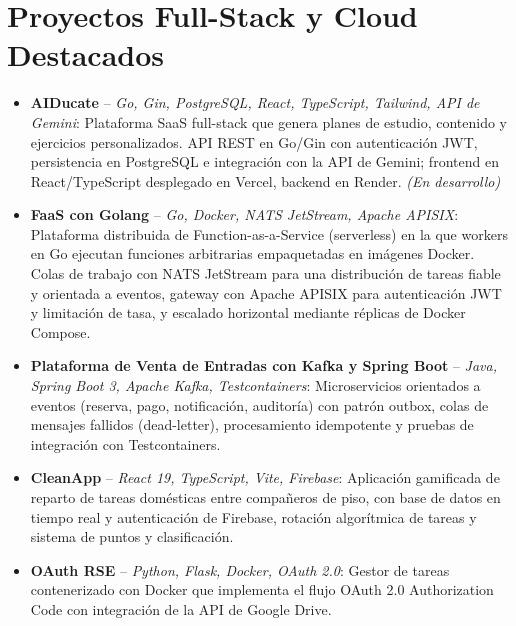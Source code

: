 \documentclass[11pt,a4paper,sans]{moderncv}
\begin{document}

\section{Proyectos Full-Stack y Cloud Destacados}
\vspace{1pt}
\begin{itemize}

\item \textbf{AIDucate} -- \textit{Go, Gin, PostgreSQL, React, TypeScript, Tailwind, API de Gemini}: Plataforma SaaS full-stack que genera planes de estudio, contenido y ejercicios personalizados. API REST en Go/Gin con autenticación JWT, persistencia en PostgreSQL e integración con la API de Gemini; frontend en React/TypeScript desplegado en Vercel, backend en Render. \textit{(En desarrollo)}

\item \textbf{FaaS con Golang} -- \textit{Go, Docker, NATS JetStream, Apache APISIX}: Plataforma distribuida de Function-as-a-Service (serverless) en la que workers en Go ejecutan funciones arbitrarias empaquetadas en imágenes Docker. Colas de trabajo con NATS JetStream para una distribución de tareas fiable y orientada a eventos, gateway con Apache APISIX para autenticación JWT y limitación de tasa, y escalado horizontal mediante réplicas de Docker Compose.

\item \textbf{Plataforma de Venta de Entradas con Kafka y Spring Boot} -- \textit{Java, Spring Boot 3, Apache Kafka, Testcontainers}: Microservicios orientados a eventos (reserva, pago, notificación, auditoría) con patrón outbox, colas de mensajes fallidos (dead-letter), procesamiento idempotente y pruebas de integración con Testcontainers.

\item \textbf{CleanApp} -- \textit{React 19, TypeScript, Vite, Firebase}: Aplicación gamificada de reparto de tareas domésticas entre compañeros de piso, con base de datos en tiempo real y autenticación de Firebase, rotación algorítmica de tareas y sistema de puntos y clasificación.

\item \textbf{OAuth RSE} -- \textit{Python, Flask, Docker, OAuth 2.0}: Gestor de tareas contenerizado con Docker que implementa el flujo OAuth 2.0 Authorization Code con integración de la API de Google Drive.

\end{itemize}
\end{document}
